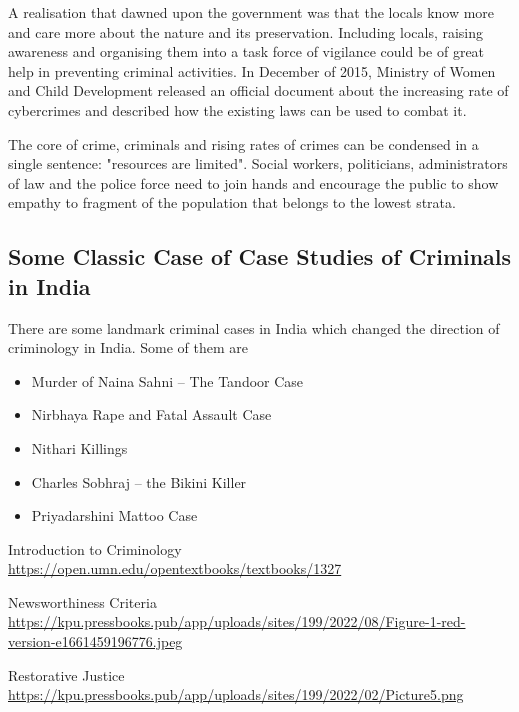 \documentclass{article}
\begin{document}
A realisation that dawned upon the government was that the locals know more and care more about the nature and its preservation. Including locals, raising awareness and organising them into a task force of vigilance could be of great help in preventing criminal activities. In December of 2015, Ministry of Women and Child Development released an official document about the increasing rate of cybercrimes and described how the existing laws can be used to combat it.

The core of crime, criminals and rising rates of crimes can be condensed in a single sentence: "resources are limited". Social workers, politicians, administrators of law and the police force need to join hands and encourage the public to show empathy to fragment of the population that belongs to the lowest strata.

\subsection{Some Classic Case of Case Studies of Criminals in India}

There are some landmark criminal cases in India which changed the direction of criminology in India. Some of them are 

\begin{itemize}
    \item Murder of Naina Sahni – The Tandoor Case
    \item Nirbhaya Rape and Fatal Assault Case
    \item Nithari Killings
    \item Charles Sobhraj – the Bikini Killer
    \item Priyadarshini Mattoo Case
\end{itemize}

\newpage

\begin{thebibliography}{99}
    {Introduction to Criminology\\
    \url{https://open.umn.edu/opentextbooks/textbooks/1327}}

    {Newsworthiness Criteria\\
    \url{https://kpu.pressbooks.pub/app/uploads/sites/199/2022/08/Figure-1-red-version-e1661459196776.jpeg}}

    {Restorative Justice\\
    \url{https://kpu.pressbooks.pub/app/uploads/sites/199/2022/02/Picture5.png}}


\end{thebibliography}
\end{document}
